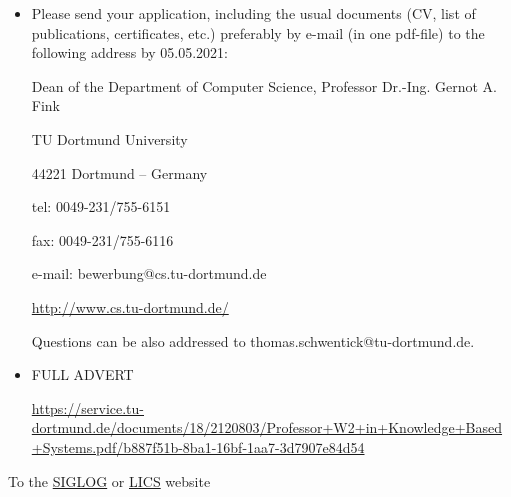 \documentclass[prodmode,acmtecs]{acmsmall} %
\begin{document}
\begin{itemize}
\item  Please send your application, including the usual documents (CV, list of publications, certificates, etc.) preferably by e-mail (in one pdf-file) to the following address by 05.05.2021: 
 
  Dean of the Department of Computer Science, Professor Dr.-Ing. Gernot A. Fink 
 
  TU Dortmund University 
 
  44221 Dortmund – Germany 
 
  tel: 0049-231/755-6151 
 
  fax: 0049-231/755-6116 
 
  e-mail: bewerbung@cs.tu-dortmund.de 
 
  \href{http://www.cs.tu-dortmund.de/}{http://www.cs.tu-dortmund.de/} 
 
  Questions can be also addressed to thomas.schwentick@tu-dortmund.de. 
 
\item  FULL ADVERT 
 
  \href{https://service.tu-dortmund.de/documents/18/2120803/Professor+W2+in+Knowledge+Based+Systems.pdf/b887f51b-8ba1-16bf-1aa7-3d7907e84d54}{https://service.tu-dortmund.de/documents/18/2120803/Professor+W2+in+Knowledge+Based+Systems.pdf/b887f51b-8ba1-16bf-1aa7-3d7907e84d54} 
 
\end{itemize}


To the \href{http://siglog.org/}{SIGLOG} or \href{https://lics.siglog.org}{LICS} website
\end{document}

